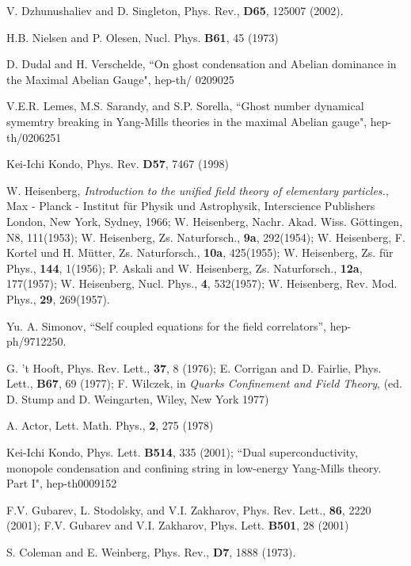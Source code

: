 \documentclass[a4paper,aps,showpacs]{revtex4}
\begin{document}
\begin{thebibliography}{99}

V. Dzhunushaliev and D. Singleton, Phys. Rev., \textbf{D65}, 
125007 (2002).

H.B. Nielsen and P. Olesen, Nucl. Phys. \textbf{B61}, 45 (1973)

D. Dudal and H. Verschelde, ``On ghost condensation and Abelian dominance in the Maximal
Abelian Gauge", hep-th/ 0209025

V.E.R. Lemes, M.S. Sarandy, and S.P. Sorella, ``Ghost number dynamical symemtry breaking
in Yang-Mills theories in the maximal Abelian gauge", hep-th/0206251

Kei-Ichi Kondo, Phys. Rev. \textbf{D57}, 7467 (1998)

W. Heisenberg, \textit{Introduction to the unified field theory of
elementary particles.}, Max - Planck - Institut f\"ur Physik und
Astrophysik, Interscience Publishers London, New York, Sydney,
1966; W. Heisenberg, Nachr. Akad. Wiss. G\"ottingen, N8,
111(1953); W. Heisenberg, Zs. Naturforsch., \textbf{9a},
292(1954); W. Heisenberg, F. Kortel und H. M\"utter, Zs.
Naturforsch., \textbf{10a}, 425(1955); W. Heisenberg, Zs. f\"ur
Phys., \textbf{144}, 1(1956); P. Askali and W. Heisenberg, Zs.
Naturforsch., \textbf{12a}, 177(1957); W. Heisenberg, Nucl. Phys.,
\textbf{4}, 532(1957); W. Heisenberg, Rev. Mod. Phys., \textbf{29},
269(1957).

Yu. A. Simonov, ``Self coupled equations for the field correlators'', 
hep-ph/9712250. 

 G. 't Hooft, Phys. Rev. Lett., \textbf{37}, 8 (1976); 
E. Corrigan and D. Fairlie, Phys. Lett., \textbf{B67}, 69
(1977); F. Wilczek, in {\it Quarks Confinement and Field Theory},
(ed. D. Stump and D. Weingarten, Wiley, New York 1977) 

 A. Actor, Lett. Math. Phys., \textbf{2}, 275 (1978)

Kei-Ichi Kondo, Phys. Lett. \textbf{B514}, 335 (2001); 
``Dual superconductivity, monopole condensation and 
confining string in low-energy Yang-Mills theory. Part I",
hep-th0009152

F.V. Gubarev, L. Stodolsky, and V.I. Zakharov, Phys. Rev. Lett.,
\textbf{86}, 2220 (2001); F.V. Gubarev and V.I. Zakharov, Phys. Lett.
\textbf{B501}, 28 (2001)

S. Coleman and E. Weinberg, Phys. Rev., \textbf{D7}, 1888 (1973).


\end{thebibliography}
\end{document}
